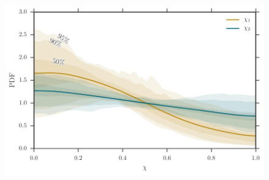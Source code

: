 

\begin{figure}
\begin{center}
\includegraphics[width=.98\columnwidth]{spin_cred_regionsspin_cred_regions}
\caption{ \protect}
\end{center}
\end{figure}



